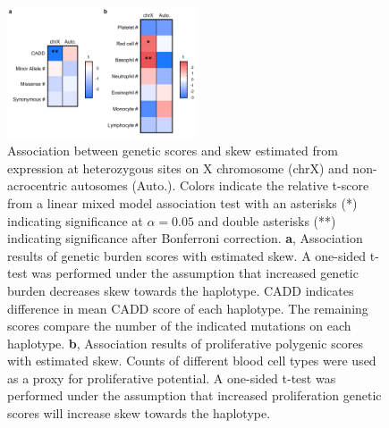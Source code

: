 \begin{figure}[ht]
    \centering
    \includegraphics[width=0.5\textwidth]{chapter4/Figures/Figure_2.png}
    \caption{
        Association between genetic scores and skew estimated from expression at heterozygous sites on X chromosome (chrX) and non-acrocentric autosomes (Auto.). Colors indicate the relative t-score from a linear mixed model association test with an asterisks (*) indicating significance at $\alpha=0.05$ and double asterisks (**) indicating significance after Bonferroni correction.
        \textbf{a}, Association results of genetic burden scores with estimated skew. A one-sided t-test was performed under the assumption that increased genetic burden decreases skew towards the haplotype. CADD indicates difference in mean CADD score of each haplotype. The remaining scores compare the number of the indicated mutations on each haplotype.
        \textbf{b}, Association results of proliferative polygenic scores with estimated skew. Counts of different blood cell types were used as a proxy for proliferative potential. A one-sided t-test was performed under the assumption that increased proliferation genetic scores will increase skew towards the haplotype.}
    \label{fig:fig4.2}
\end{figure}